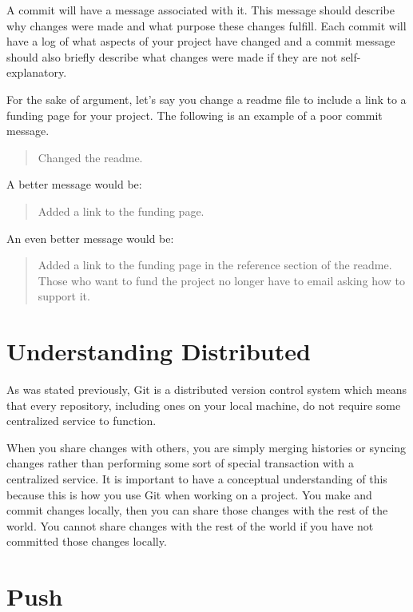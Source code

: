 \documentclass[
]{book}
\begin{document}
A commit will have a message associated with it. This message should describe why changes were made and what purpose these changes fulfill. Each commit will have a log of what aspects of your project have changed and a commit message should also briefly describe what changes were made if they are not self-explanatory.

For the sake of argument, let's say you change a readme file to include a link to a funding page for your project. The following is an example of a poor commit message.

\begin{quote}
Changed the readme.
\end{quote}

A better message would be:

\begin{quote}
Added a link to the funding page.
\end{quote}

An even better message would be:

\begin{quote}
Added a link to the funding page in the reference section of the readme. Those who want to fund the project no longer have to email asking how to support it.
\end{quote}

\hypertarget{understanding-distributed}{%
\section{Understanding Distributed}\label{understanding-distributed}}

As was stated previously, Git is a distributed version control system which means that every repository, including ones on your local machine, do not require some centralized service to function.

When you share changes with others, you are simply merging histories or syncing changes rather than performing some sort of special transaction with a centralized service. It is important to have a conceptual understanding of this because this is how you use Git when working on a project. You make and commit changes locally, then you can share those changes with the rest of the world. You cannot share changes with the rest of the world if you have not committed those changes locally.

\hypertarget{push}{%
\section{Push}\label{push}}
\end{document}
